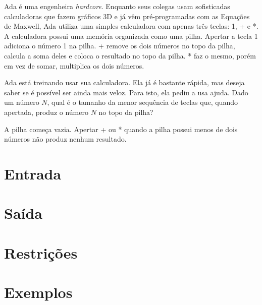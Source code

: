 Ada é uma engenheira \emph{hardcore}. Enquanto seus colegas usam sofisticadas calculadoras que fazem gráficos 3D
e já vêm pré-programadas com as Equações de Maxwell, Ada utiliza uma simples calculadora com apenas três teclas:
1, + e *. A calculadora possui uma memória organizada como uma pilha. Apertar a tecla 1 adiciona o número 1 na pilha.
+ remove os dois números no topo da pilha, calcula a soma deles e coloca o resultado no topo da pilha.
* faz o mesmo, porém em vez de somar, multiplica os dois números.

Ada está treinando usar sua calculadora. Ela já é bastante rápida, mas deseja saber se é possível ser ainda mais veloz.
Para isto, ela pediu a usa ajuda. Dado um número $N$, qual é o tamanho da menor sequência de teclas que, quando apertada,
produz o número $N$ no topo da pilha?

A pilha começa vazia. Apertar + ou * quando a pilha possui menos de dois números não produz nenhum resultado.

\section*{Entrada}

\section*{Saída}


\section*{Restrições}

\begin{itemize}
\end{itemize}


\section*{Exemplos}

\exemplo
